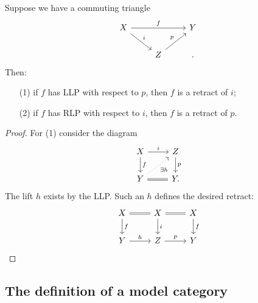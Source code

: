 \documentclass[11pt]{amsart}
\begin{document}
\begin{prop}
Suppose we have a commuting triangle
\[
\begin{tikzcd}
X \ar[rr,"f"] \ar[dr,"i"] & & Y \\
& Z \ar[ur, "p"] & .
\end{tikzcd}
\]
Then:
\begin{enumerate}
\item[(1)] 
if $f$ has LLP with respect to $p$, then $f$ is a retract of $i$;
\item[(2)] if $f$ has RLP with respect to $i$, then $f$ is a retract of $p$. 
\end{enumerate}
\end{prop}
\begin{proof}
For (1) consider the diagram
\[
\begin{tikzcd}
X \ar[r,"i"] \ar[d,"f"] & Z \ar[d,"p"] \\ 
Y \ar[r,equals] \ar[ur, dotted, "\exists h"'] & Y .
\end{tikzcd}
\]
The lift $h$ exists by the LLP. 
Such an $h$ defines the desired retract:
\[
\begin{tikzcd}
X \ar[r,equals] \ar[d,"f"] & X \ar[d, "i"] \ar[r,equals] & X \ar[d, "f"] \\
Y \ar[r,"h"] & Z \ar[r,"p"] & Y 
\end{tikzcd}
\]
\end{proof}

\subsection{The definition of a model category}
\end{document}
